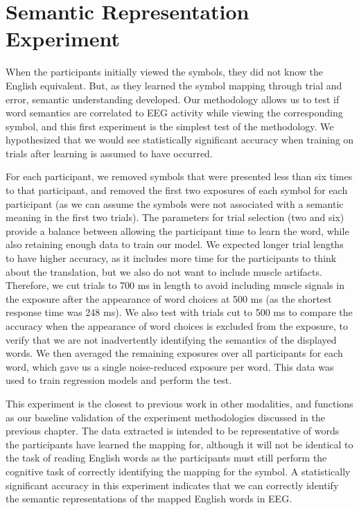 \section{Semantic Representation Experiment}
\label{sec:experiments:semanticrepresentation}
When the participants initially viewed the symbols, they did not know the 
English equivalent. But, as they learned the symbol mapping through trial and 
error, semantic understanding developed. Our methodology allows us to test if 
word semantics are correlated to EEG activity while viewing the corresponding 
symbol, and this first experiment is the simplest test of the methodology. We 
hypothesized that we would see statistically significant accuracy when training 
on trials after learning is assumed to have occurred.

For each participant, we removed symbols that were presented less than six 
times to that participant, and removed the first two exposures of each symbol 
for each participant (as we can assume the symbols were not associated with a 
semantic meaning in the first two trials). The parameters for trial selection 
(two and six) provide a balance between allowing the participant time to learn 
the word, while also retaining enough data to train our model. We expected 
longer trial lengths to have higher accuracy, as it includes more time for the 
participants to think about the translation, but we also do not want to include 
muscle artifacts. Therefore, we cut trials to 700 ms in length to avoid 
including muscle signals in the exposure after the appearance of word choices 
at 500 ms (as the shortest response time was 248 ms).  We also test with trials 
cut to 500 ms to compare the \tvt accuracy when the appearance of word choices 
is excluded from the exposure, to verify that we are not inadvertently 
identifying the semantics of the displayed words.  We then averaged the 
remaining exposures over all participants for each word, which gave us a single 
noise-reduced exposure per word. This data was used to train regression models 
and perform the \tvt test. 

This experiment is the closest to previous work in other modalities, and 
functions as our baseline validation of the experiment methodologies discussed 
in the previous chapter. The data extracted is intended to be representative of 
words the participants have learned the mapping for, although it will not be 
identical to the task of reading English words as the participants must still 
perform the cognitive task of correctly identifying the mapping for the symbol.  
A statistically significant \tvt accuracy in this experiment indicates that we 
can correctly identify the semantic representations of the mapped English words 
in EEG.
